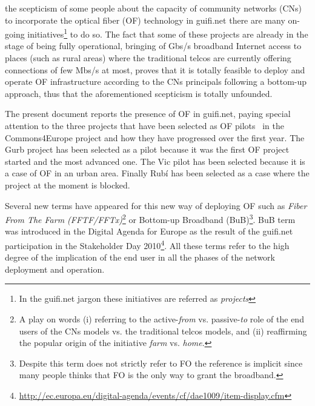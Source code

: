  the scepticism of some people about the capacity of community networks (CNs) to incorporate the optical fiber (OF) technology in guifi.net there are many on-going initiatives\footnote{In the guifi.net jargon these initiatives are referred as \emph{projects}} to do so. The fact that some of these projects are already in the stage of being fully operational, bringing of Gbs/s broadband Internet access to places (such as rural areas) where the traditional telcos are currently offering connections of few Mbs/s at most, proves that it is totally feasible to deploy and operate OF infrastructure according to the CNs principals following a bottom-up approach, thus that the aforementioned scepticism is totally unfounded.

The present document reports the presence of OF in guifi.net, paying special attention to the three projects that have been selected as OF pilots~\cite{barcelo2012bub} in the Commons4Europe project and how they have progressed over the first year. The Gurb project has been selected as a pilot because it was the first OF project started and the most advanced one. The Vic pilot has been selected because it is a case of OF in an urban area. Finally Rub\'{i} has been selected as a case where the project at the moment is blocked.

Several new terms have appeared for this new way of deploying OF such as \emph{Fiber From The Farm (FFTF/FFTx)}\footnote{A play on words (i) referring to the active-\emph{from} vs. passive-\emph{to} role of the end users of the CNs models vs. the traditional telcos models, and (ii) reaffirming the popular origin of the initiative \emph{farm} vs. \emph{home}. } or Bottom-up Broadband (BuB)\footnote{Despite this term does not strictly refer to FO the reference is implicit since many people thinks that FO is the only way to grant the broadband.}. BuB term was introduced in the Digital Agenda for Europe as the result of the guifi.net participation in the Stakeholder Day 2010\footnote{\url{http://ec.europa.eu/digital-agenda/events/cf/dae1009/item-display.cfm}}. All these terms refer to the high degree of the implication of the end user in all the phases of the network deployment and operation.

